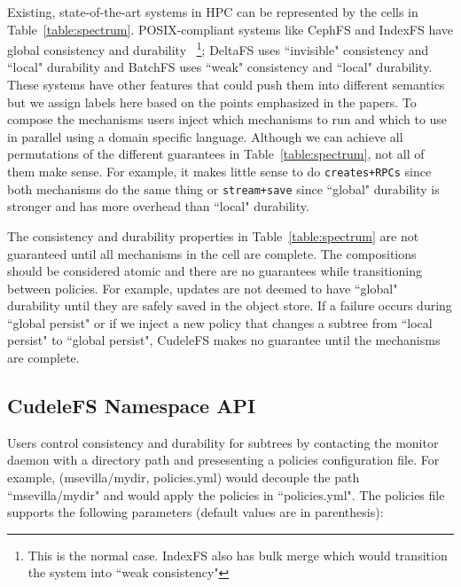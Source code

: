Existing, state-of-the-art systems in HPC can be represented by the cells in
Table~\ref{table:spectrum}.  POSIX-compliant systems like CephFS and IndexFS
have global consistency and durability ~\footnote{This is the normal case.
IndexFS also has bulk merge which would transition the system into ``weak
consistency"}; DeltaFS uses ``invisible" consistency and ``local" durability
and BatchFS uses ``weak" consistency and ``local" durability. These systems
have other features that could push them into different semantics but we assign
labels here based on the points emphasized in the papers.  To compose the
mechanisms users inject which mechanisms to run and which to use in parallel
using a domain specific language.  Although we can achieve all permutations of
the different guarantees in Table~\ref{table:spectrum}, not all of them make
sense. For example, it makes little sense to do \texttt{creates+RPCs} since
both mechanisms do the same thing or \texttt{stream+save} since ``global"
durability is stronger and has more overhead than ``local" durability. 

The consistency and durability properties in Table~\ref{table:spectrum} are not
guaranteed until all mechanisms in the cell are complete. The compositions
should be considered atomic and there are no guarantees while transitioning
between policies. For example, updates are not deemed to have ``global" durability until
they are safely saved in the object store. If a failure occurs during ``global
persist" or if we inject a new policy that changes a subtree from ``local
persist" to ``global persist", CudeleFS makes no guarantee until the mechanisms are
complete.

\subsection{CudeleFS Namespace API}
\label{sec:cudelefs-namespace-api}



Users control consistency and durability for subtrees by contacting the monitor
daemon with a directory path and presesenting a policies configuration file.
For example, (msevilla/mydir, policies.yml) would decouple the path
``msevilla/mydir" and would apply the policies in ``policies.yml".  The
policies file supports the following parameters (default values are in parenthesis):

